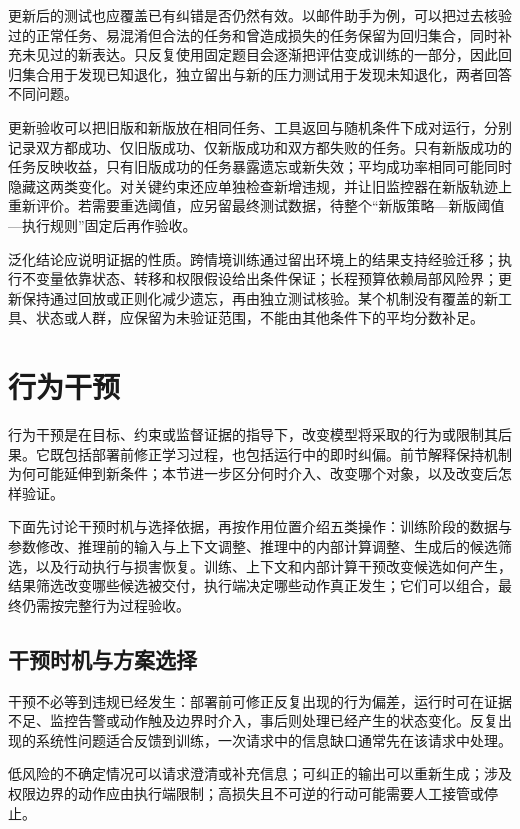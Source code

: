 更新后的测试也应覆盖已有纠错是否仍然有效。以邮件助手为例，可以把过去核验过的正常任务、易混淆但合法的任务和曾造成损失的任务保留为回归集合，同时补充未见过的新表达。只反复使用固定题目会逐渐把评估变成训练的一部分，因此回归集合用于发现已知退化，独立留出与新的压力测试用于发现未知退化，两者回答不同问题。

更新验收可以把旧版和新版放在相同任务、工具返回与随机条件下成对运行，分别记录双方都成功、仅旧版成功、仅新版成功和双方都失败的任务。只有新版成功的任务反映收益，只有旧版成功的任务暴露遗忘或新失效；平均成功率相同可能同时隐藏这两类变化。对关键约束还应单独检查新增违规，并让旧监控器在新版轨迹上重新评价。若需要重选阈值，应另留最终测试数据，待整个“新版策略—新版阈值—执行规则”固定后再作验收。

泛化结论应说明证据的性质。跨情境训练通过留出环境上的结果支持经验迁移；执行不变量依靠状态、转移和权限假设给出条件保证；长程预算依赖局部风险界；更新保持通过回放或正则化减少遗忘，再由独立测试核验。某个机制没有覆盖的新工具、状态或人群，应保留为未验证范围，不能由其他条件下的平均分数补足。

\section{行为干预}
\label{sec:alignment-intervention}

行为干预是在目标、约束或监督证据的指导下，改变模型将采取的行为或限制其后果。它既包括部署前修正学习过程，也包括运行中的即时纠偏。前节解释保持机制为何可能延伸到新条件；本节进一步区分何时介入、改变哪个对象，以及改变后怎样验证。

下面先讨论干预时机与选择依据，再按作用位置介绍五类操作：训练阶段的数据与参数修改、推理前的输入与上下文调整、推理中的内部计算调整、生成后的候选筛选，以及行动执行与损害恢复。训练、上下文和内部计算干预改变候选如何产生，结果筛选改变哪些候选被交付，执行端决定哪些动作真正发生；它们可以组合，最终仍需按完整行为过程验收。

\subsection{干预时机与方案选择}
\label{sec:alignment-intervention-decision}

干预不必等到违规已经发生：部署前可修正反复出现的行为偏差，运行时可在证据不足、监控告警或动作触及边界时介入，事后则处理已经产生的状态变化。反复出现的系统性问题适合反馈到训练，一次请求中的信息缺口通常先在该请求中处理。

低风险的不确定情况可以请求澄清或补充信息；可纠正的输出可以重新生成；涉及权限边界的动作应由执行端限制；高损失且不可逆的行动可能需要人工接管或停止。

